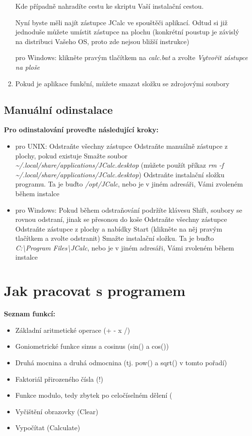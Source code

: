 \documentclass[a4paper, 11pt]{article}
\begin{document}
\begin{enumerate}
			\subsubitem Kde případně nahradíte cestu ke skriptu Vaší instalační cestou.

			\subsubitem Nyní byste měli najít zástupce JCalc ve spouštěči aplikací. Odtud si již jednoduše můžete umístit zástupce na plochu (konkrétní poustup je závislý na distribuci Vašeho OS, proto zde nejsou bližší instrukce)

		\subitem pro Windows:
			\subsubitem klikněte pravým tlačítkem na \emph{calc.bat} a zvolte \emph{Vytvořit zástupce na ploše}


	\item Pokud je aplikace funkční, můžete smazat složku se zdrojovými soubory
\end{enumerate}

\subsection{Manuální odinstalace}

\textbf{Pro odinstalování proveďte následující kroky:}

\begin{itemize}
	\item pro UNIX:
		\subitem Odstraňte všechny zástupce
			\subsubitem Odstraňte manuálně zástupce z plochy, pokud existuje
			\subsubitem Smažte soubor \emph{\textasciitilde/.local/share/applications/JCalc.desktop}
			\subsubitem (můžete použít příkaz \emph{rm -f \textasciitilde/.local/share/applications/JCalc.desktop})
		\subitem Odstraňte instalační složku programu. Ta je buďto \emph{/opt/JCalc}, nebo je v jiném adresáři, Vámi zvoleném během instalce

	\item pro Windows:
		\subitem Pokud během odstraňování podržíte klávesu Shift, soubory se rovnou odstraní, jinak se přesonou do koše
		\subitem Odstraňte všechny zástupce
			\subsubitem Odstraňte zástupce z plochy a nabídky Start (klikněte na něj pravým tlačítkem a zvolte odstranit)
		\subitem Smažte instalační složku. Ta je buďto \emph{C:\textbackslash Program Files\textbackslash JCalc}, nebo je v jiném adresáři, Vámi zvoleném během instalce
\end{itemize}

\section{Jak pracovat s programem}

\textbf{Seznam funkcí:}

\begin{itemize}
    \item Základní aritmetické operace (+ - x /)
    \item Goniometrické funkce sinus a cosinus (sin() a cos())
    \item Druhá mocnina a druhá odmocnina (tj. pow() a sqrt() v tomto pořadí)
    \item Faktoriál přirozeného čísla (!)
    \item Funkce modulo, tedy zbytek po celočíselném dělení (%
    \item Vyčištění obrazovky (Clear)
    \item Vypočítat (Calculate)
\end{itemize}
\end{document}
